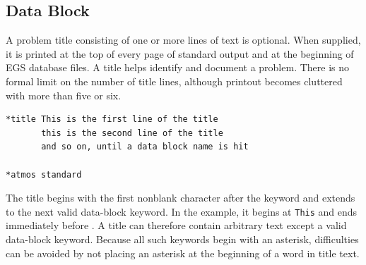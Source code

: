 \subsection{ Data Block}\label{sec:block-title}

A problem title consisting of one or more lines of text is optional. When supplied,
it is printed at the top of every page of standard output and at the beginning of EGS
database files. A title helps identify and document a problem. There is no formal
limit on the number of title lines, although printout becomes cluttered with more
than five or six.

\begin{lstlisting}[style=taosmanual]
*title This is the first line of the title
       this is the second line of the title
       and so on, until a data block name is hit

*atmos standard
\end{lstlisting}

The title begins with the first nonblank character after the
 keyword and extends to the next valid data-block keyword. In
the example, it begins at \texttt{This} and ends immediately before
. A title can therefore contain arbitrary text except a valid
data-block keyword. Because all such keywords begin with an asterisk, difficulties
can be avoided by not placing an asterisk at the beginning of a word in title text.
